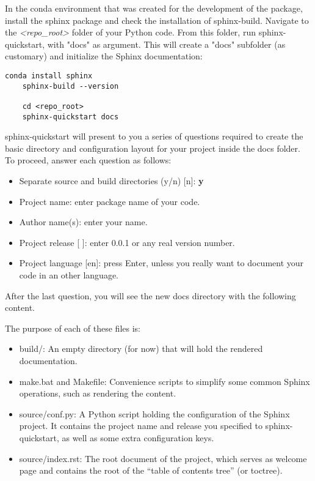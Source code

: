 In the \textsf{conda} environment that was created for the development of the package, install the \textsf{sphinx} package and check the installation of \textsf{sphinx-build}. Navigate to the \textit{\textless repo\_root\textgreater} folder of your Python code. From this folder, run \textsf{sphinx-quickstart}, with "docs" as argument. This will create a "\textsf{docs}" subfolder (as customary) and initialize the \textsf{Sphinx} documentation:

\begin{lstlisting}[style=DOS]
	conda install sphinx
	sphinx-build --version
	
	cd <repo_root>
	sphinx-quickstart docs	
\end{lstlisting}

\textsf{sphinx-quickstart} will present to you a series of questions required to create the basic directory and configuration layout for your project inside the \textsf{docs} folder. To proceed, answer each question as follows:
\begin{itemize}
	\item Separate source and build directories (y/n) [n]: \textbf{y}
	\item Project name: enter package name of your code.
    \item Author name(s): enter your name.
	\item Project release [ ]: enter 0.0.1 or any real version number.
	\item Project language [en]: press Enter, unless you really want to document your code in an other language.
\end{itemize}

After the last question, you will see the new docs directory with the following content. \\

\label{tree:src} 

The purpose of each of these files is:

\begin{itemize}
	\item \textsf{build/}: An empty directory (for now) that will hold the rendered documentation.
	\item \textsf{make.bat} and\textsf{ Makefile}: Convenience scripts to simplify some common Sphinx operations, such as rendering the content.
	\item \textsf{source/conf.py}: A Python script holding the configuration of the Sphinx project. It contains the project name and release you specified to sphinx-quickstart, as well as some extra configuration keys.
	\item \textsf{source/index.rst}: The root document of the project, which serves as welcome page and contains the root of the “table of contents tree” (or toctree).
	
\end{itemize}

